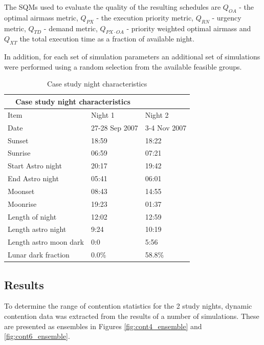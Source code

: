 The SQMs used to evaluate the quality of the resulting schedules are $Q_{OA}$ - the optimal airmass metric, $Q_{PX}$ - the execution priority metric, $Q_{RN}$ - urgency metric, $Q_{TD}$ - demand metric, $Q_{PX \cdot OA}$ - priority weighted optimal airmass and $Q_{XT}$ the total execution time as a fraction of available night. 

In addition, for each set of simulation parameters an additional set of simulations were performed using a random selection from the available feasible groups.

\begin{table}[htbp]
\begin{center}

\begin{tabular}{lll}
\toprule
\multicolumn{2}{c}{Case study night characteristics} \\
\midrule
Item & Night 1 & Night 2 \\
\midrule
Date                & 27-28 Sep 2007 & 3-4 Nov 2007\\
Sunset              & 18:59          & 18:22\\
Sunrise             & 06:59          & 07:21\\
Start Astro night   & 20:17          & 19:42\\
End Astro night     & 05:41          & 06:01\\
Moonset             & 08:43          & 14:55\\
Moonrise            & 19:23          & 01:37\\
\midrule
Length of night     & 12:02          & 12:59\\
Length astro night  & 9:24           & 10:19\\
Length astro moon dark    & 0:0     & 5:56\\
Lunar dark fraction & 0.0\%           & 58.8\%\\
\bottomrule
\end{tabular}
\caption{Case study night characteristics}
\label{tab:scoring_nights}
\end{center}
\end{table}

\subsection{Results}
To determine the range of contention statistics for the 2 study nights, dynamic contention data was extracted from the results of a number of simulations. These are presented as ensembles in Figures \ref{fig:cont4_ensemble} and \ref{fig:cont6_ensemble}.

